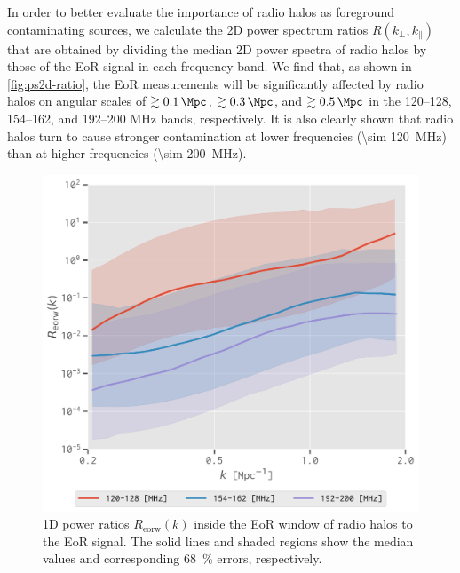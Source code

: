 \documentclass[twocolumn]{aastex62}
\newcommand{\R}[1]{\mathrm{#1}}
\newcommand{\klos}{\text{$k_{\parallel}$}}
\newcommand{\kperp}{\text{$k_{\bot}$}}
\begin{document}
In order to better evaluate the importance of radio halos as foreground
contaminating sources, we calculate the 2D power spectrum ratios
$R(\kperp, \klos)$ that are obtained by dividing the median 2D power
spectra of radio halos by those of the EoR signal in each frequency band.
We find that, as shown in \autoref{fig:ps2d-ratio}, the EoR measurements
will be significantly affected by radio halos on angular scales of
$\gtrsim \SI{0.1}{\per\Mpc}$, $\gtrsim \SI{0.3}{\per\Mpc}$, and
$\gtrsim \SI{0.5}{\per\Mpc}$ in the \numrange{120}{128},
\numrange{154}{162}, and \numrange{192}{200} \si{\MHz} bands, respectively.
It is also clearly shown that radio halos turn to cause stronger
contamination at lower frequencies (\SI{\sim 120}{\MHz}) than at higher
frequencies (\SI{\sim 200}{\MHz}).

\begin{figure}
  \centering
  \includegraphics[width=\columnwidth]{ps1d-ratio-3bands}
  \caption{\label{fig:ps1d-ratio}%
    1D power ratios $R_{\R{eorw}}(k)$ inside the EoR window of
    radio halos to the EoR signal.
    The solid lines and shaded regions show the median values and
    corresponding \SI{68}{\percent} errors, respectively.
  }
\end{figure}
\end{document}
